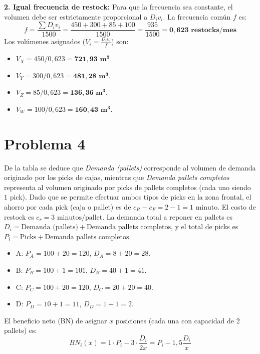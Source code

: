 \documentclass[11pt]{article}
\begin{document}
\textbf{2. Igual frecuencia de restock:}
Para que la frecuencia sea constante, el volumen debe ser estrictamente proporcional a $D_i v_i$.
La frecuencia común $f$ es:
$$ f = \frac{\sum D_i v_i}{1500} = \frac{450 + 300 + 85 + 100}{1500} = \frac{935}{1500} = \mathbf{0,623 \text{ restocks/mes}} $$
Los volúmenes asignados ($V_i = \frac{D_i v_i}{f}$) son:
\begin{itemize}
    \item $V_X = 450 / 0,623 = \mathbf{721,93 \text{ m}^3}$.
    \item $V_Y = 300 / 0,623 = \mathbf{481,28 \text{ m}^3}$.
    \item $V_Z = 85 / 0,623 = \mathbf{136,36 \text{ m}^3}$.
    \item $V_W = 100 / 0,623 = \mathbf{160,43 \text{ m}^3}$.
\end{itemize}


\section*{Problema 4}

De la tabla se deduce que \textit{Demanda (pallets)} corresponde al volumen de demanda originado por los picks de cajas, mientras que \textit{Demanda pallets completos} representa al volumen originado por picks de pallets completos (cada uno siendo $1$ pick). 
Dado que se permite efectuar ambos tipos de picks en la zona frontal, el ahorro por cada pick (caja o pallet) es de $c_R - c_F = 2 - 1 = 1 \text{ minuto}$. El costo de restock es $c_r = 3 \text{ minutos/pallet}$.
La demanda total a reponer en pallets es $D_i = \text{Demanda (pallets)} + \text{Demanda pallets completos}$, y el total de picks es $P_i = \text{Picks} + \text{Demanda pallets completos}$.
\begin{itemize}
    \item A: $P_A = 100 + 20 = 120$, $D_A = 8 + 20 = 28$.
    \item B: $P_B = 100 + 1 = 101$, $D_B = 40 + 1 = 41$.
    \item C: $P_C = 100 + 20 = 120$, $D_C = 20 + 20 = 40$.
    \item D: $P_D = 10 + 1 = 11$, $D_D = 1 + 1 = 2$.
\end{itemize}
El beneficio neto (BN) de asignar $x$ posiciones (cada una con capacidad de 2 pallets) es:
$$ BN_i(x) = 1 \cdot P_i - 3 \cdot \frac{D_i}{2x} = P_i - 1,5 \frac{D_i}{x} $$
\end{document}
